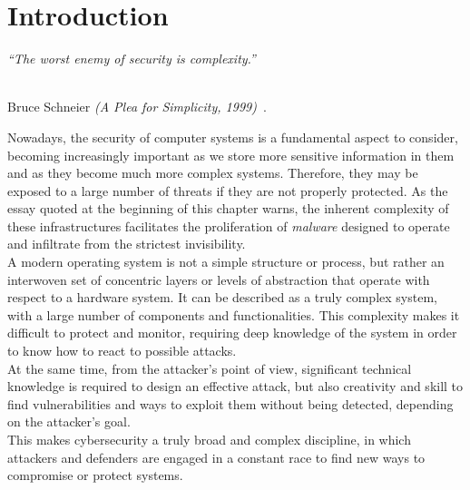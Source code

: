 \chapter{Introduction}
\label{cap:capitulo1}
\setcounter{page}{1}

\begin{flushright}
\begin{minipage}[]{10cm}
\emph{``The worst enemy of security is complexity.''}\\
\end{minipage}\\

Bruce Schneier \textit{(A Plea for Simplicity, 1999)}~\cite{schneier}.
\end{flushright}

\vspace{1cm}

Nowadays, the security of computer systems is a fundamental aspect to consider, becoming increasingly important as we store more sensitive information in them and as they become much more complex systems. Therefore, they may be exposed to a large number of threats if they are not properly protected.
As the essay quoted at the beginning of this chapter warns, the inherent complexity of these infrastructures facilitates the proliferation of \textit{malware} designed to operate and infiltrate from the strictest invisibility.\\

A modern operating system is not a simple structure or process, but rather an interwoven set of concentric layers or levels of abstraction that operate with respect to a hardware system. It can be described as a truly complex system, with a large number of components and functionalities. This complexity makes it difficult to protect and monitor, requiring deep knowledge of the system in order to know how to react to possible attacks.\\

At the same time, from the attacker's point of view, significant technical knowledge is required to design an effective attack, but also creativity and skill to find vulnerabilities and ways to exploit them without being detected, depending on the attacker's goal.\\

This makes cybersecurity a truly broad and complex discipline, in which attackers and defenders are engaged in a constant race to find new ways to compromise or protect systems.\\

